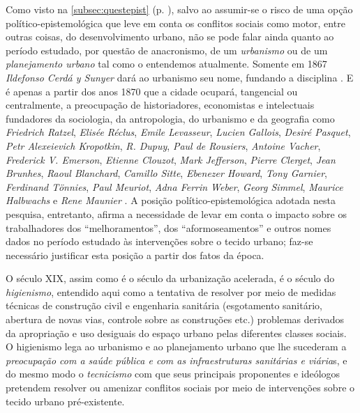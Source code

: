 Como visto na \autoref{subsec:questepist} (p. \pageref{subsec:questepist}), salvo ao assumir-se o risco de uma opção político-epistemológica que leve em conta os conflitos sociais como motor, entre outras coisas, do desenvolvimento urbano, não se pode falar ainda quanto ao período estudado, por questão de anacronismo, de um \textit{urbanismo} ou de um \textit{planejamento urbano} tal como o entendemos atualmente. Somente em 1867 \textit{Ildefonso Cerdá y Sunyer} dará ao urbanismo seu nome, fundando a disciplina \cite[pp.~47-51]{vasconcelos_dois_2012}. E é apenas a partir dos anos 1870 que a cidade ocupará, tangencial ou centralmente, a preocupação de historiadores, economistas e intelectuais fundadores da sociologia, da antropologia, do urbanismo e da geografia como \textit{Friedrich Ratzel}, \textit{Elisée Réclus}, \textit{Emile Levasseur}, \textit{Lucien Gallois}, \textit{Desiré Pasquet}, \textit{Petr Alexeievich Kropotkin}, \textit{R. Dupuy}, \textit{Paul de Rousiers}, \textit{Antoine Vacher}, \textit{Frederick V. Emerson}, \textit{Etienne Clouzot}, \textit{Mark Jefferson}, \textit{Pierre Clerget}, \textit{Jean Brunhes}, \textit{Raoul Blanchard}, \textit{Camillo Sitte}, \textit{Ebenezer Howard}, \textit{Tony Garnier}, \textit{Ferdinand Tönnies}, \textit{Paul Meuriot}, \textit{Adna Ferrin Weber}, \textit{Georg Simmel}, \textit{Maurice Halbwachs} e \textit{Rene Maunier} \cite[pp.~53-102]{vasconcelos_dois_2012}. A posição político-epistemológica adotada nesta pesquisa, entretanto, afirma a necessidade de levar em conta o impacto sobre os trabalhadores dos ``melhoramentos'', dos ``aformoseamentos'' e outros nomes dados no período estudado às intervenções sobre o tecido urbano; faz-se necessário justificar esta posição a partir dos fatos da época.

O século XIX, assim como é o século da urbanização acelerada, é o século do \textit{higienismo}, entendido aqui como a tentativa de resolver por meio de medidas técnicas de construção civil e engenharia sanitária (esgotamento sanitário, abertura de novas vias, controle sobre as construções etc.) problemas derivados da apropriação e uso desiguais do espaço urbano pelas diferentes classes sociais. O higienismo lega ao urbanismo e ao planejamento urbano que lhe sucederam a \textit{preocupação com a saúde pública e com as infraestruturas sanitárias e viária}s, e do mesmo modo o \textit{tecnicismo} com que seus principais proponentes e ideólogos pretendem resolver ou amenizar conflitos sociais por meio de intervenções sobre o tecido urbano pré-existente.

